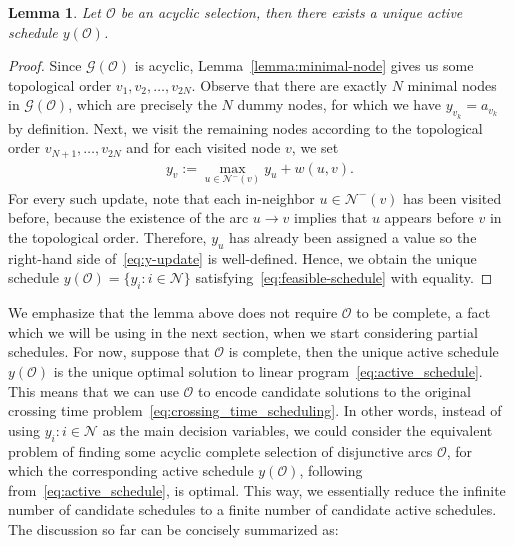 \documentclass[a4paper]{report}
\theoremstyle{definition}
\theoremstyle{plain}
\newtheorem{lemma}{Lemma}[chapter]
\begin{document}
\begin{lemma}\label{lemma:unique-active-schedule}
  Let $\mathcal{O}$ be an acyclic selection, then there
  exists a unique active schedule $y(\mathcal{O})$.
\end{lemma}
\begin{proof}
  Since $\mathcal{G}(\mathcal{O})$ is acyclic, Lemma~\ref{lemma:minimal-node} gives us
  some topological order $v_1, v_2, \dots, v_{2N}$.
  Observe that there are exactly $N$ minimal nodes in $\mathcal{G}(\mathcal{O})$, which
  are precisely the $N$ dummy nodes, for which we have $y_{v_k} = a_{v_k}$ by
  definition.
  Next, we visit the remaining nodes according to the topological order
  $v_{N+1}, \dots, v_{2N}$ and for each visited node $v$, we set
  \begin{align}
    \label{eq:y-update}
   y_{v} := \max_{u \in \mathcal{N}^-(v)} y_{u} + w(u,v) .
  \end{align}
  For every such update, note that each in-neighbor $u \in \mathcal{N}^-(v)$ has
  been visited before, because the existence of the arc $u \rightarrow v$
  implies that $u$ appears before $v$ in the topological order. Therefore,
  $y_{u}$ has already been assigned a value so the right-hand side
  of~\eqref{eq:y-update} is well-defined. Hence, we obtain the unique schedule
  $y(\mathcal{O}) = \{ y_i : i \in \mathcal{N} \}$ satisfying~\eqref{eq:feasible-schedule} with equality.
\end{proof}

We emphasize that the lemma above does not require $\mathcal{O}$ to be complete,
a fact which we will be using in the next section, when we start considering
partial schedules.
%
For now, suppose that $\mathcal{O}$ is complete, then the unique active schedule
$y(\mathcal{O})$ is the unique optimal solution to linear program~\eqref{eq:active_schedule}.
%
This means that we can use $\mathcal{O}$ to encode candidate solutions to the
original crossing time problem~\eqref{eq:crossing_time_scheduling}.
%
In other words, instead of using $y_i : i \in \mathcal{N}$ as the main decision
variables, we could consider the equivalent problem of finding some acyclic
complete selection of disjunctive arcs $\mathcal{O}$, for which the
corresponding active schedule $y(\mathcal{O})$, following from~\eqref{eq:active_schedule}, is optimal.
%
This way, we essentially reduce the infinite number of candidate schedules to
a finite number of candidate active schedules.
%
The discussion so far can be concisely summarized as:
\end{document}
